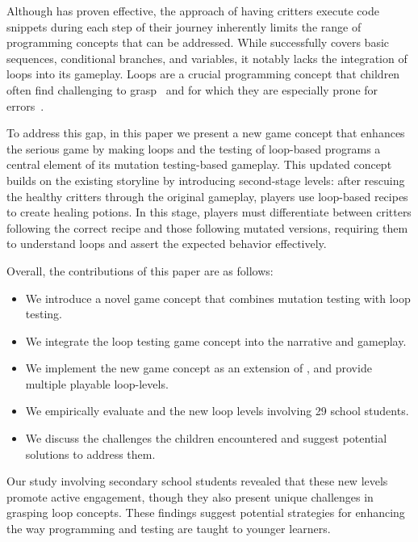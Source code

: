Although \toolname has proven effective, the approach of having critters execute code snippets during each step of their journey inherently limits the range of programming concepts that can be addressed. While \toolname successfully covers basic sequences, conditional branches, and variables, it notably lacks the integration of loops into its gameplay. Loops are a crucial programming concept that children often find challenging to grasp~\cite{DBLP:journals/ijcci/GomesFT18,DBLP:conf/sigcse/GroverB17,bentz2023novice} and for which they are especially prone for errors~\cite{DBLP:journals/tse/Ntafos88}. %

To address this gap, in this paper we present a new game concept that enhances the \toolname serious game by making loops and the testing of loop-based programs a central element of its mutation testing-based gameplay. 
%
This updated concept builds on the existing \toolname storyline by introducing second-stage levels: after rescuing the healthy critters through the original gameplay, players use loop-based recipes to create healing potions. In this stage, players must differentiate between critters following the correct recipe and those following mutated versions, requiring them to understand loops and assert the expected behavior effectively.

Overall, the contributions of this paper are as follows:
%
\begin{itemize}
\item We introduce a novel game concept that combines mutation testing
  with loop testing.
\item We integrate the loop testing game concept into the \toolname
  narrative and gameplay.
\item We implement the new game concept as an extension of \toolname,
  and provide multiple playable loop-levels.
\item We empirically evaluate \toolname and the new loop levels
  involving 29 school students.
\item We discuss the challenges the children encountered and suggest
  potential solutions to address them.
\end{itemize}

Our study involving secondary school students revealed that these new
levels promote active engagement, though they also present unique
challenges in grasping loop concepts. These findings suggest potential
strategies for enhancing the way programming and testing are taught to
younger learners.


